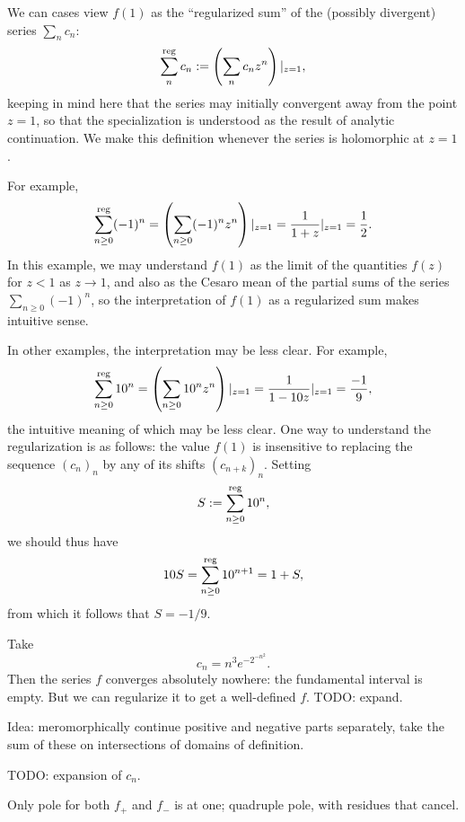 \documentclass[reqno]{amsart}  \numberwithin{theorem}{section} \numberwithin{equation}{section}
\begin{document}
\begin{remark}
  We can cases view $f(1)$ as the ``regularized sum'' of the (possibly divergent) series $\sum_n c_n$:
  \begin{equation*}
\sum_{n}^{\operatorname{reg}} c_n := \left( \sum_n c_n z^n \right)|_{z=1}, 
\end{equation*}
keeping in mind here that the series may initially convergent away from the point $z=1$, so that the specialization is understood as the result of analytic continuation.  We make this definition whenever the series is holomorphic at $z=1$.

For example,
  \begin{equation*}
    \sum_{n \geq 0}^{\operatorname{reg}} (-1)^n
    =
    \left( \sum_{n \geq 0} (-1)^n z^n \right)|_{z=1}
    = \frac{1}{1 + z} \vert_{z=1} = \frac{1}{2}.
\end{equation*}
In this example, we may understand $f(1)$ as the limit of the quantities $f(z)$ for $z < 1$ as $z \rightarrow 1$, and also as the Cesaro mean of the partial sums of the series $\sum_{n \geq 0} (-1)^n$, so the interpretation of $f(1)$ as a regularized sum makes intuitive sense.

In other examples, the interpretation may be less clear.  For example,
\begin{equation*}
  \sum_{n \geq 0}^{\operatorname{reg}} 10^n =
  \left( \sum_{n \geq 0} 10^n z^n \right)|_{z=1}
  =
  \frac{1}{1 - 10 z} \vert_{z=1} =
  \frac{-1}{9},
\end{equation*}
the intuitive meaning of which may be less clear.  One way to understand the regularization is as follows: the value $f(1)$ is insensitive to replacing the sequence $(c_n)_n$ by any of its shifts $(c_{n+k})_n$.  Setting
\begin{equation*}
S := \sum_{n \geq 0}^{\operatorname{reg}} 10^n,
\end{equation*}
we should thus have
\begin{equation*}
  10 S = \sum_{n \geq 0}^{\operatorname{reg}} 10^{n+1}
= 1 + S,
\end{equation*}
from which it follows that $S = -1/9$.
\end{remark}

\begin{example}
  Take
  \begin{equation*}
c_n = n^3 e^{- 2^{- n^2 }}.
\end{equation*}
Then the series $f$ converges absolutely nowhere: the fundamental interval is empty.  But we can regularize it to get a well-defined $f$.  TODO: expand.

Idea: meromorphically continue positive and negative parts separately, take the sum of these on intersections of domains of definition.

TODO: expansion of $c_n$.

Only pole for both $f_+$ and $f_-$ is at one; quadruple pole, with residues that cancel.
\end{example}
\end{document}
